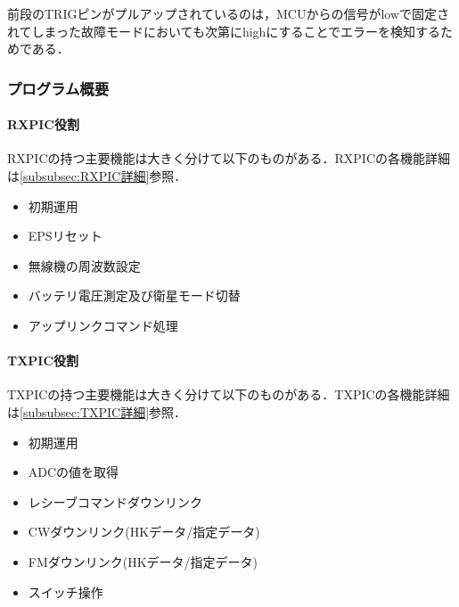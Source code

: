 前段のTRIGピンがプルアップされているのは，MCUからの信号がlowで固定されてしまった故障モードにおいても次第にhighにすることでエラーを検知するためである．


\subsubsection{プログラム概要}
\paragraph{RXPIC役割}\label{par:RXPIC役割}
RXPICの持つ主要機能は大きく分けて以下のものがある．RXPICの各機能詳細は\ref{subsubsec:RXPIC詳細}参照．
\begin{itemize}
	\item 初期運用
	\item EPSリセット
	\item 無線機の周波数設定
	\item バッテリ電圧測定及び衛星モード切替
	\item アップリンクコマンド処理
\end{itemize}

\paragraph{TXPIC役割}\label{par:TXPIC役割}
TXPICの持つ主要機能は大きく分けて以下のものがある．TXPICの各機能詳細は\ref{subsubsec:TXPIC詳細}参照．
\begin{itemize}
	\item 初期運用
	\item ADCの値を取得
	\item レシーブコマンドダウンリンク
	\item CWダウンリンク(HKデータ/指定データ)
	\item FMダウンリンク(HKデータ/指定データ)
	\item スイッチ操作
\end{itemize}

